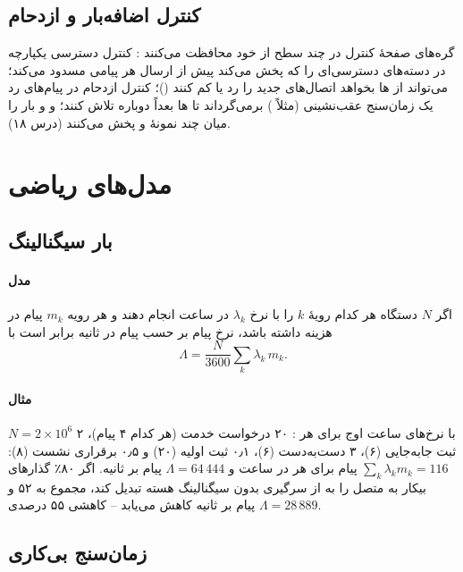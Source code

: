 \documentclass[11pt,a4paper]{article}
\begin{document}
\subsection{کنترل اضافه‌بار و ازدحام}
گره‌های صفحهٔ کنترل در چند سطح از خود محافظت می‌کنند \cite{ts23501,ts24501}: کنترل دسترسی یکپارچه در  دسته‌های دسترسی‌ای را که  پخش
می‌کند پیش از ارسال هر پیامی مسدود می‌کند؛  می‌تواند از ها بخواهد اتصال‌های  جدید را رد یا کم کنند ()؛ کنترل ازدحام  در پیام‌های رد یک زمان‌سنج عقب‌نشینی (مثلاً ) برمی‌گرداند تا ها بعداً دوباره تلاش کنند؛ و  و
 بار را میان چند نمونهٔ  و  پخش می‌کنند (درس ۱۸).

\section{مدل‌های ریاضی}

\subsection{بار سیگنالینگ}\label{sec:load}
\paragraph{مدل} اگر $N$ دستگاه  هر کدام رویهٔ $k$ را با نرخ $\lambda_k$ در ساعت انجام دهند و هر رویه $m_k$ پیام در  هزینه داشته
باشد، نرخ پیام بر حسب پیام در ثانیه برابر است با
\begin{equation}\label{eq:load}
  \Lambda = \frac{N}{3600} \sum_{k} \lambda_k\, m_k .
\end{equation}
\paragraph{مثال} $N = 2\times10^{6}$ با نرخ‌های ساعت اوج برای هر : ۲۰ درخواست خدمت (هر کدام ۴ پیام)، ۲ ثبت جابه‌جایی (۶)، ۳ دست‌به‌دست (۶)،
۰٫۱ ثبت اولیه (۲۰) و ۰٫۵ برقراری نشست  (۸): $\sum_k \lambda_k m_k = 116$ پیام برای هر  در ساعت و $\Lambda = 64\,444$ پیام بر ثانیه. اگر
 ۸۰٪ گذارهای بیکار به متصل را به از سرگیری بدون سیگنالینگ هسته تبدیل کند، مجموع به ۵۲ و $\Lambda = 28\,889$ پیام بر ثانیه کاهش
می‌یابد -- کاهشی ۵۵ درصدی.

\subsection{زمان‌سنج بی‌کاری}\label{sec:timer}
\end{document}
